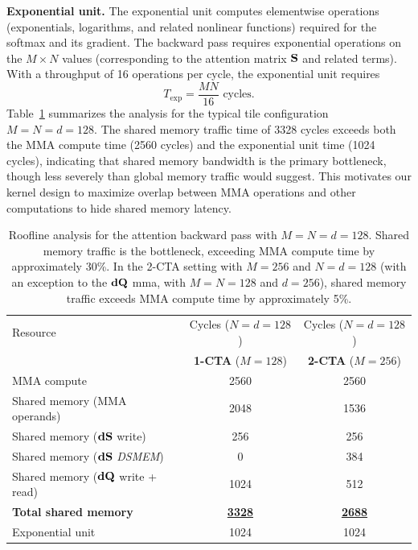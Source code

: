 \noindent\textbf{Exponential unit.}
The exponential unit computes elementwise operations (exponentials, logarithms, and related nonlinear functions) required for the softmax and its gradient. The backward pass requires exponential operations on the $M \times N$ values (corresponding to the attention matrix $\mathbf{S}$ and related terms). With a throughput of 16 operations per cycle, the exponential unit requires
{\setlength{\abovedisplayskip}{1pt}%
 \setlength{\belowdisplayskip}{1pt}%
 \setlength{\abovedisplayshortskip}{1pt}%
 \setlength{\belowdisplayshortskip}{1pt}%
\begin{equation}
    T_{\text{exp}} = \frac{MN}{16} \text{ cycles}.
\end{equation}}
Table~\ref{tab:bwd_roofline} summarizes the analysis for the typical tile configuration $M = N = d = 128$. The shared memory traffic time of 3328 cycles exceeds both the MMA compute time (2560 cycles) and the exponential unit time (1024 cycles), indicating that shared memory bandwidth is the primary bottleneck, though less severely than global memory traffic would suggest. This motivates our kernel design to maximize overlap between MMA operations and other computations to hide shared memory latency.

\begin{table}[t]
\centering
\begin{tabular}{lcc}
\toprule
Resource & Cycles ($N = d = 128$) & Cycles ($N = d = 128$) \\
         & \textbf{1-CTA} ($M = 128$) & \textbf{2-CTA} ($M = 256$) \\
\midrule
MMA compute & 2560 & 2560 \\
Shared memory (MMA operands) & 2048 & 1536 \\
Shared memory ($\mathbf{dS}$ write) & 256  & 256 \\
Shared memory ($\mathbf{dS}$ \textit{DSMEM}) & 0 & 384 \\
Shared memory ($\mathbf{dQ}$ write + read) & 1024 & 512 \\
\textbf{Total shared memory} & \underline{\textbf{3328}} & \underline{\textbf{2688}} \\
Exponential unit & 1024 & 1024\\
\bottomrule
\end{tabular}
\caption{Roofline analysis for the attention backward pass with $M = N = d = 128$. Shared memory traffic is the bottleneck, exceeding MMA compute time by approximately 30\%. In the 2-CTA setting with $M =256$ and $N = d = 128$ (with an exception to the $\mathbf{dQ}$ mma, with $M = N =128$ and $d=256$), shared memory traffic exceeds MMA compute time by approximately 5\%.}
\label{tab:bwd_roofline}
\end{table}

